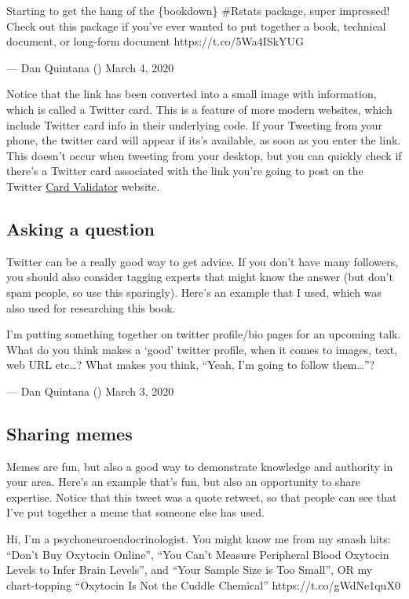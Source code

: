 \documentclass[]{book}
\begin{document}
Starting to get the hang of the \{bookdown\} \#Rstats package, super impressed! Check out this package if you've ever wanted to put together a book, technical document, or long-form document https://t.co/5Wa4ISkYUG

--- Dan Quintana (\citet{dsquintana}) March 4, 2020

Notice that the link has been converted into a small image with information, which is called a Twitter card. This is a feature of more modern websites, which include Twitter card info in their underlying code. If your Tweeting from your phone, the twitter card will appear if its's available, as soon as you enter the link. This doesn't occur when tweeting from your desktop, but you can quickly check if there's a Twitter card associated with the link you're going to post on the Twitter \href{https://cards-dev.twitter.com/validator}{Card Validator} website.

\hypertarget{asking-a-question}{%
\subsection{Asking a question}\label{asking-a-question}}

Twitter can be a really good way to get advice. If you don't have many followers, you should also consider tagging experts that might know the answer (but don't spam people, so use this sparingly). Here's an example that I used, which was also used for researching this book.

I'm putting something together on twitter profile/bio pages for an upcoming talk. What do you think makes a `good' twitter profile, when it comes to images, text, web URL etc\ldots{}? What makes you think, ``Yeah, I'm going to follow them\ldots{}''?

--- Dan Quintana (\citet{dsquintana}) March 3, 2020

\hypertarget{sharing-memes}{%
\subsection{Sharing memes}\label{sharing-memes}}

Memes are fun, but also a good way to demonstrate knowledge and authority in your area. Here's an example that's fun, but also an opportunity to share expertise. Notice that this tweet was a quote retweet, so that people can see that I've put together a meme that someone else has used.

Hi, I'm a psychoneuroendocrinologist. You might know me from my smash hits: ``Don't Buy Oxytocin Online'', ``You Can't Measure Peripheral Blood Oxytocin Levels to Infer Brain Levels'', and ``Your Sample Size is Too Small'', OR my chart-topping ``Oxytocin Is Not the Cuddle Chemical'' https://t.co/gWdNe1quX0
\end{document}
